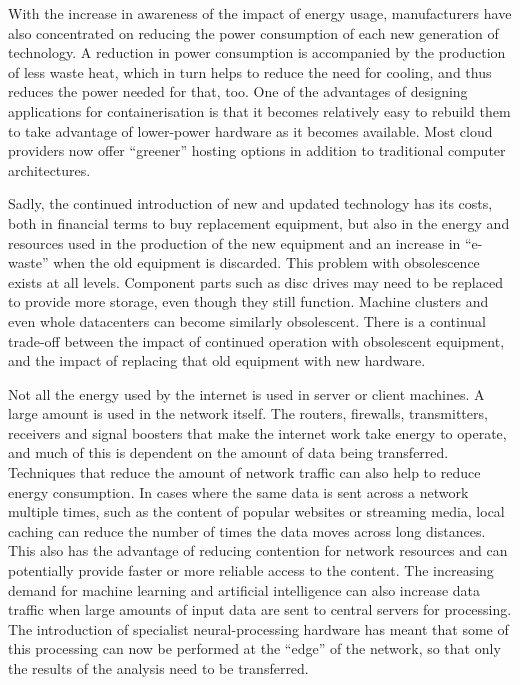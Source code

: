 With the increase in awareness of the impact of energy usage, manufacturers have also concentrated on reducing the power consumption of each new generation of technology. A reduction in power consumption is accompanied by the production of less waste heat, which in turn helps to reduce the need for cooling, and thus reduces the power needed for that, too. One of the advantages of designing applications for containerisation is that it becomes relatively easy to rebuild them to take advantage of lower-power hardware as it becomes available. Most cloud providers now offer \enquote{greener} hosting options in addition to traditional computer architectures.

\label{A22}
Sadly, the continued introduction of new and updated technology has its costs, both in financial terms to buy replacement equipment, but also in the energy and resources used in the production of the new equipment and an increase in \enquote{e-waste} when the old equipment is discarded. This problem with obsolescence exists at all levels. Component parts such as disc drives may need to be replaced to provide more storage, even though they still function. Machine clusters and even whole datacenters can become similarly obsolescent. There is a continual trade-off between the impact of continued operation with obsolescent equipment, and the impact of replacing that old equipment with new hardware. 

Not all the energy used by the internet is used in server or client machines. A large amount is used in the network itself. The routers, firewalls, transmitters, receivers and signal boosters that make the internet work take energy to operate, and much of this is dependent on the amount of data being transferred. Techniques that reduce the amount of network traffic can also help to reduce energy consumption. In cases where the same data is sent across a network multiple times, such as the content of popular websites or streaming media, local caching can reduce the number of times the data moves across long distances. This also has the advantage of reducing contention for network resources and can potentially provide faster or more reliable access to the content. The increasing demand for machine learning and artificial intelligence can also increase data traffic when large amounts of input data are sent to central servers for processing. The introduction of specialist neural-processing hardware has meant that some of this processing can now be performed at the \enquote{edge} of the network, so that only the results of the analysis need to be transferred. 

